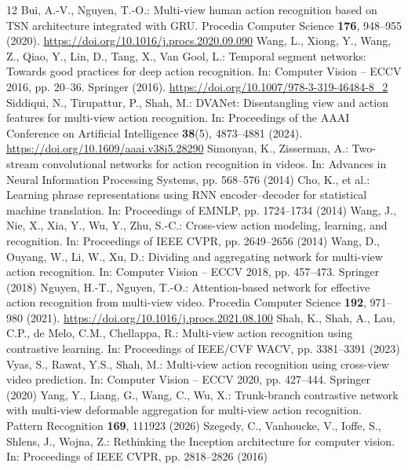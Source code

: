 \documentclass[runningheads]{llncs}
\begin{document}
\begin{thebibliography}{12}
 Bui, A.-V., Nguyen, T.-O.: Multi-view human action recognition based on TSN architecture integrated with GRU. Procedia Computer Science \textbf{176}, 948--955 (2020). \url{https://doi.org/10.1016/j.procs.2020.09.090}
 Wang, L., Xiong, Y., Wang, Z., Qiao, Y., Lin, D., Tang, X., Van Gool, L.: Temporal segment networks: Towards good practices for deep action recognition. In: Computer Vision -- ECCV 2016, pp. 20--36. Springer (2016). \url{https://doi.org/10.1007/978-3-319-46484-8_2}
 Siddiqui, N., Tirupattur, P., Shah, M.: DVANet: Disentangling view and action features for multi-view action recognition. In: Proceedings of the AAAI Conference on Artificial Intelligence \textbf{38}(5), 4873--4881 (2024). \url{https://doi.org/10.1609/aaai.v38i5.28290}
 Simonyan, K., Zisserman, A.: Two-stream convolutional networks for action recognition in videos. In: Advances in Neural Information Processing Systems, pp. 568--576 (2014)
 Cho, K., et al.: Learning phrase representations using RNN encoder--decoder for statistical machine translation. In: Proceedings of EMNLP, pp. 1724--1734 (2014)
 Wang, J., Nie, X., Xia, Y., Wu, Y., Zhu, S.-C.: Cross-view action modeling, learning, and recognition. In: Proceedings of IEEE CVPR, pp. 2649--2656 (2014)
 Wang, D., Ouyang, W., Li, W., Xu, D.: Dividing and aggregating network for multi-view action recognition. In: Computer Vision -- ECCV 2018, pp. 457--473. Springer (2018)
 Nguyen, H.-T., Nguyen, T.-O.: Attention-based network for effective action recognition from multi-view video. Procedia Computer Science \textbf{192}, 971--980 (2021). \url{https://doi.org/10.1016/j.procs.2021.08.100}
 Shah, K., Shah, A., Lau, C.P., de Melo, C.M., Chellappa, R.: Multi-view action recognition using contrastive learning. In: Proceedings of IEEE/CVF WACV, pp. 3381--3391 (2023)
 Vyas, S., Rawat, Y.S., Shah, M.: Multi-view action recognition using cross-view video prediction. In: Computer Vision -- ECCV 2020, pp. 427--444. Springer (2020)
 Yang, Y., Liang, G., Wang, C., Wu, X.: Trunk-branch contrastive network with multi-view deformable aggregation for multi-view action recognition. Pattern Recognition \textbf{169}, 111923 (2026)
 Szegedy, C., Vanhoucke, V., Ioffe, S., Shlens, J., Wojna, Z.: Rethinking the Inception architecture for computer vision. In: Proceedings of IEEE CVPR, pp. 2818--2826 (2016)
\end{thebibliography}
\end{document}

